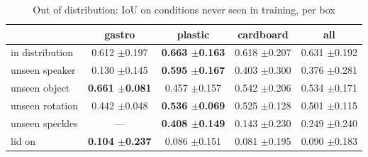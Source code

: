 \begin{table}
\caption{Out of distribution: IoU on conditions never seen in training, per box}
\label{tab:ood_iou}
\begin{tabular}{l!{\vrule width 1.2pt}ccc!{\vrule width 1.2pt}c}
\toprule
 & gastro & plastic & cardboard & all \\
\midrule
in distribution & 0.612 {\scriptsize $\pm$0.197} & \bfseries 0.663 {\scriptsize $\pm$0.163} & 0.618 {\scriptsize $\pm$0.207} & 0.631 {\scriptsize $\pm$0.192} \\
unseen speaker & 0.130 {\scriptsize $\pm$0.145} & \bfseries 0.595 {\scriptsize $\pm$0.167} & 0.403 {\scriptsize $\pm$0.300} & 0.376 {\scriptsize $\pm$0.281} \\
unseen object & \bfseries 0.661 {\scriptsize $\pm$0.081} & 0.457 {\scriptsize $\pm$0.157} & 0.542 {\scriptsize $\pm$0.206} & 0.534 {\scriptsize $\pm$0.171} \\
unseen rotation & 0.442 {\scriptsize $\pm$0.048} & \bfseries 0.536 {\scriptsize $\pm$0.069} & 0.525 {\scriptsize $\pm$0.128} & 0.501 {\scriptsize $\pm$0.115} \\
unseen speckles & — & \bfseries 0.408 {\scriptsize $\pm$0.149} & 0.143 {\scriptsize $\pm$0.230} & 0.249 {\scriptsize $\pm$0.240} \\
lid on & \bfseries 0.104 {\scriptsize $\pm$0.237} & 0.086 {\scriptsize $\pm$0.151} & 0.081 {\scriptsize $\pm$0.195} & 0.090 {\scriptsize $\pm$0.183} \\
\bottomrule
\end{tabular}
\end{table}
